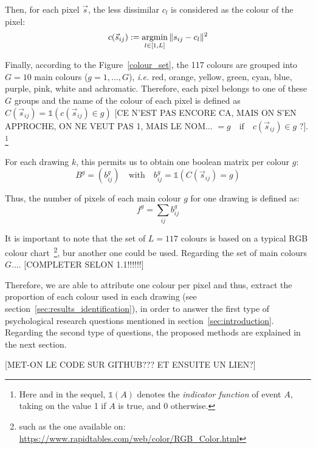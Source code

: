 \documentclass[11pt,a4paper]{article}
\begin{document}
Then, for each pixel \(\vec{s}\), the less dissimilar \(c_l\) is considered as
the colour of the pixel:
\begin{equation*}
c(\vec{s}_{ij}) := \operatornamewithlimits{argmin}_{l \in [1,L]} \| s_{ij} - c_{l} \|^{2}
\end{equation*}

Finally, according to the Figure~\ref{colour_set}, the 117 colours are grouped into $G = 10$
main colours ($g = 1, \dots, G$), \textit{i.e.} red, orange, yellow, green, cyan, blue, purple, pink,
white and achromatic. Therefore, each pixel belongs to one of these
$G$ groups and the name of the colour of each pixel is defined as $C(\vec{s}_{ij}) = \mathds{1}(c(\vec{s}_{ij}) \in g)$ [CE N'EST PAS ENCORE CA, MAIS ON S'EN APPROCHE, ON NE VEUT PAS 1, MAIS LE NOM... $= g \quad \textrm{if} \quad c(\vec{s}_{ij}) \in g$ ?]. \footnote{Here and in the sequel, $\mathds{1}(A)$ denotes the \textit{indicator function} of event $A$, taking on the value 1 if $A$ is true, and 0 otherwise.}

For each drawing $k$, this permits us to obtain one
boolean matrix per colour $g$:
\begin{equation}
B^{g} = (b_{ij}^{g}) \quad \textrm{with} \quad b_{ij}^{g} =  \mathds{1}(C(\vec{s}_{ij}) = g)
\end{equation}

Thus, the number of pixels of each main colour $g$ for one drawing is defined as:
\begin{equation}
	f^{g} = \sum_{ij}b_{ij}^{g}
\end{equation}


It is important to note that the set of $L=117$ colours is based on a typical RGB colour chart~\footnote{such as the one available on: \url{https://www.rapidtables.com/web/color/RGB_Color.html}}, bur another one could be used. Regarding the set of main colours $G$.... [COMPLETER SELON 1.1!!!!!!]

Therefore, we are able to attribute one colour per pixel and thus, extract the proportion of
each colour used in each drawing (see section~\ref{sec:results_identification}), in order to answer the first type of psychological research questions mentioned in section~\ref{sec:introduction}. 
Regarding the second type of questions, the proposed methods are explained in the next section.





[MET-ON LE CODE SUR GITHUB??? ET ENSUITE UN LIEN?]
\end{document}
